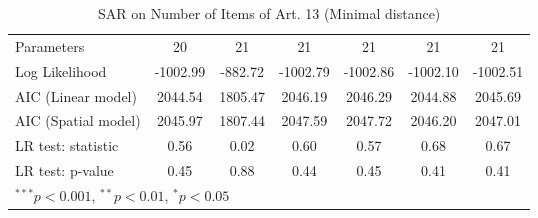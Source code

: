 \begin{table}[!h]
\begin{center}
\begin{tabular}{l c c c c c c }
Parameters              & 20           & 21           & 21           & 21           & 21           & 21           \\
Log Likelihood          & -1002.99     & -882.72      & -1002.79     & -1002.86     & -1002.10     & -1002.51     \\
AIC (Linear model)      & 2044.54      & 1805.47      & 2046.19      & 2046.29      & 2044.88      & 2045.69      \\
AIC (Spatial model)     & 2045.97      & 1807.44      & 2047.59      & 2047.72      & 2046.20      & 2047.01      \\
LR test: statistic      & 0.56         & 0.02         & 0.60         & 0.57         & 0.68         & 0.67         \\
LR test: p-value        & 0.45         & 0.88         & 0.44         & 0.45         & 0.41         & 0.41         \\
\bottomrule
\multicolumn{7}{l}{\scriptsize{$^{***}p<0.001$, $^{**}p<0.01$, $^*p<0.05$}}
\end{tabular}
\caption{SAR on Number of Items of Art. 13 (Minimal distance)}
\label{table:coefficients}
\end{center}
\end{table}
